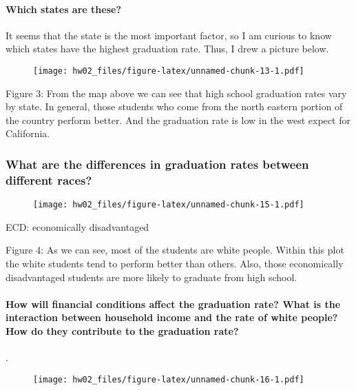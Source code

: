 \documentclass[]{article}
\begin{document}
\paragraph{Which states are these?}\label{which-states-are-these}

It seems that the state is the most important factor, so I am curious to
know which states have the highest graduation rate. Thus, I drew a
picture below.

\begin{figure}[H]
\centering
\texttt{[image: hw02\_files/figure-latex/unnamed-chunk-13-1.pdf]}
\caption{}
\end{figure}

Figure 3: From the map above we can see that high school graduation rates vary by
state. In general, those students who come from the north eastern
portion of the country perform better. And the graduation rate is low in
the west expect for California.

\subsubsection{What are the differences in graduation rates between
different
races?}\label{what-are-the-differences-in-graduation-rates-between-different-races}


\begin{figure}[H]
\centering
\texttt{[image: hw02\_files/figure-latex/unnamed-chunk-15-1.pdf]}
\caption{}
\end{figure}

ECD: economically disadvantaged

Figure 4: As we can see, most of the students are white people. Within this plot
the white students tend to perform better than others. Also, those
economically disadvantaged students are more likely to graduate from
high school.

\paragraph{How will financial conditions affect the graduation rate?
What is the interaction between household income and the rate of white
people? How do they contribute to the graduation
rate?}\label{how-will-financial-conditions-affect-the-graduation-rate-what-is-the-interaction-between-household-income-and-the-rate-of-white-people-how-do-they-contribute-to-the-graduation-rate}

.

\begin{figure}[H]
\centering
\texttt{[image: hw02\_files/figure-latex/unnamed-chunk-16-1.pdf]}
\caption{}
\end{figure}
\end{document}
